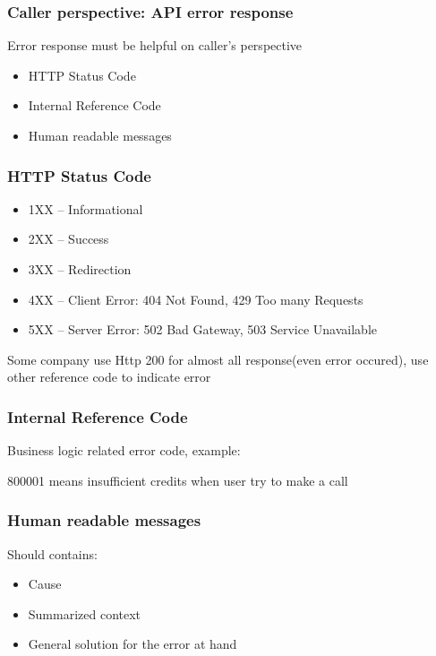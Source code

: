 \documentclass[9pt]{beamer}
\begin{document}
\begin{frame}[fragile]
\frametitle{Caller perspective: API error response}


Error response must be helpful on caller's perspective


\begin{itemize}
\item HTTP Status Code
\item Internal Reference Code
\item Human readable messages
\end{itemize}


\end{frame}

\begin{frame}[fragile]
\frametitle{HTTP Status Code}


\begin{itemize}
\item 1XX – Informational
\item 2XX – Success
\item 3XX – Redirection
\item 4XX – Client Error: 404 Not Found, 429 Too many Requests
\item 5XX – Server Error: 502 Bad Gateway, 503 Service Unavailable
\end{itemize}

Some company use Http 200 for almost all response(even error occured), use other reference code to indicate error



\end{frame}

\begin{frame}[fragile]
\frametitle{Internal Reference Code}


Business logic related error code, example: 


800001 means insufficient credits when user try to make a call



\end{frame}

\begin{frame}[fragile]
\frametitle{Human readable messages}


Should contains: 


\begin{itemize}
\item Cause
\item Summarized context
\item General solution for the error at hand
\end{itemize}


\end{frame}
\end{document}
